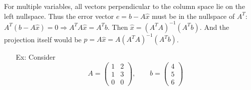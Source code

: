 \documentclass[reqno]{amsart}
\theoremstyle{definition}
\begin{document}
For multiple variables, all vectors perpendicular to the column space lie on the left nullspace.  Thus the error
vector $e = b - A\hat{x}$ must be in the nullspace of $A^T$:  $A^T(b - A\hat{x}) = 0 \Rightarrow A^TA\hat{x} = A^Tb$.
Then $\hat{x} = (A^TA)^{-1}(A^Tb)$.  And the projection itself would be $p = A\hat{x} = A(A^TA)^{-1}(A^Tb)$.

\begin{itemize}

\item[Ex:  ]  Consider
%
\begin{equation*}
A = \begin{pmatrix}
1 & 2\\
1 & 3\\
0 & 0
\end{pmatrix},\qquad b = \begin{pmatrix}
4\\
5\\
6
\end{pmatrix}
\end{equation*}
%


\end{itemize}
\end{document}
